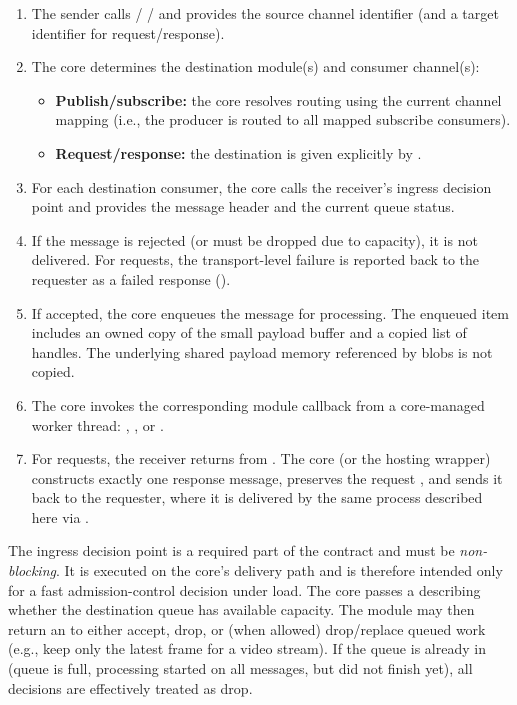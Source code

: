 \begin{enumerate}
    \item The sender calls  /  /  and provides the source channel identifier (and a target identifier for request/response).
    \item The core determines the destination module(s) and consumer channel(s):
    \begin{itemize}
        \item \textbf{Publish/subscribe:} the core resolves routing using the current channel mapping (i.e., the producer is routed to all mapped subscribe consumers).
        \item \textbf{Request/response:} the destination is given explicitly by .
    \end{itemize}
    \item For each destination consumer, the core calls the receiver's ingress decision point  and provides the message header and the current queue status.
    \item If the message is rejected (or must be dropped due to capacity), it is not delivered. For requests, the transport-level failure is reported back to the requester as a failed response ().
    \item If accepted, the core enqueues the message for processing. The enqueued item includes an owned copy of the small payload buffer and a copied list of  handles. The underlying shared payload memory referenced by blobs is not copied.
    \item The core invokes the corresponding module callback from a core-managed worker thread: , , or .
    \item For requests, the receiver returns  from . The core (or the hosting wrapper) constructs exactly one response message, preserves the request , and sends it back to the requester, where it is delivered by the same process described here via .
\end{enumerate}

The ingress decision point  is a required part of the contract and must be \emph{non-blocking}. It is executed on the core's delivery path and is therefore intended only for a fast admission-control decision under load. The core passes a  describing whether the destination queue has available capacity. The module may then return an  to either accept, drop, or (when allowed) drop/replace queued work (e.g., keep only the latest frame for a video stream). If the queue is already in  (queue is full, processing started on all messages, but did not finish yet), all decisions are effectively treated as drop.

